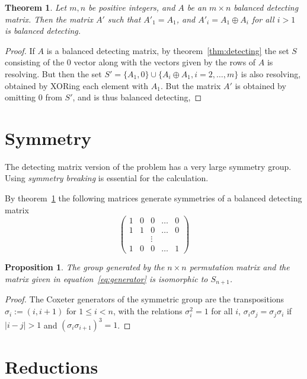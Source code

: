 \documentclass{article}
\renewcommand{\eqref}[1]{equation~\ref{eq:#1}}
\newcommand{\thmref}[1]{theorem~\ref{thm:#1}}
\newtheorem{proposition}{Proposition}
\newtheorem{theorem}{Theorem}
\begin{document}
\begin{theorem}
\label{thm:symmetry}
  Let $m,n$ be positive integers, and $A$ be an $m \times n$ balanced
  detecting matrix.  Then the matrix $A'$ such that $A'_1 = A_1$, and
  $A'_i = A_1 \oplus A_i$ for all $i > 1$ is balanced detecting.
\end{theorem}
\begin{proof}
  If $A$ is a balanced detecting matrix, by \thmref{detecting} the set
  $S$ consisting of the $0$ vector along with the vectors given by the
  rows of $A$ is resolving.  But then the set $S' = \{ A_1, 0 \} \cup \{
  A_i \oplus A_1, i=2,\dots, m\}$ is also resolving, obtained by
  XORing each element with $A_1$.  But the matrix $A'$ is obtained by
  omitting $0$ from $S'$, and is thus balanced detecting,
\end{proof}
\section{Symmetry}
\label{sec:symmetry}
The detecting matrix version of the problem has a very large symmetry
group. Using \emph{symmetry breaking} is essential for the
calculation.

By \thmref{symmetry} the following matrices generate symmetries of a
balanced detecting matrix
\begin{equation}
  \label{eq:generator}
  \begin{pmatrix}
    1 & 0 & 0 & \dots & 0 \\
    1 & 1 & 0 & \dots & 0 \\
    & & \vdots \\
    1 & 0 & 0 & \dots & 1
  \end{pmatrix}
\end{equation}

\begin{proposition}
  The group generated by the $n \times n$ permutation matrix and the
  matrix given in \eqref{generator} is isomorphic to $S_{n+1}$.
\end{proposition}
\begin{proof}
  The Coxeter generators of the symmetric group are the transpositions
  $\sigma_i := (i, i+1)$ for $1 \le i < n$, with the relations
  $\sigma_i^2 = 1$ for all $i$, $\sigma_i \sigma_j = \sigma_j
  \sigma_i$ if $|i-j| > 1$ and $(\sigma_i \sigma_{i+1})^3 = 1$.
\end{proof}

\section{Reductions}
\label{sec:reductions}
\end{document}
